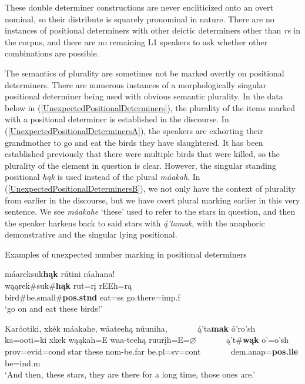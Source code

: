 These double determiner constructions are never encliticized onto an overt nominal, so their distribute is squarely pronominal in nature. There are no instances of positional determiners with other deictic determiners other than \textit{re} in the corpus, and there are no remaining L1 speakers to ask whether other combinations are possible.

The semantics of plurality are sometimes not be marked overtly on positional determiners. There are numerous instances of a morphologically singular positional determiner being used with obvious semantic plurality. In the data below in (\ref{UnexpectedPositionalDeterminers}), the plurality of the items marked with a positional determiner is established in the discourse. In (\ref{UnexpectedPositionalDeterminersA}), the speakers are exhorting their grandmother to go and eat the birds they have slaughtered. It has been established previously that there were multiple birds that were killed, so the plurality of the element in question is clear. However, the singular standing positional \textit{hąk} is used instead of the plural \textit{máakah}. In (\ref{UnexpectedPositionalDeterminersB}), we not only have the context of plurality from earlier in the discourse, but we have overt plural marking earlier in this very sentence. We see \textit{máakahe} `these' used to refer to the stars in question, and then the speaker harkens back to said stars with \textit{ą́'tamak}, with the anaphoric demonstrative and the singular lying positional.

\begin{exe}
    \item\label{UnexpectedPositionalDeterminers} Examples of unexpected number marking in positional determiners

    \begin{xlist}
        \item\label{UnexpectedPositionalDeterminersA} \glll máareksuk\textbf{hąk} rútini ráahana!\\
        wąąrek\#suk\#\textbf{hąk} rut=rį rEEh=rą\\
        \textnormal{bird}\#\textnormal{be.small}\#\textbf{pos.stnd} \textnormal{eat}=ss \textnormal{go.there}=imp.f\\
        \glt `go on and eat these birds!' \citep[148]{hollow1973a}

        \item\label{UnexpectedPositionalDeterminersB} \glll Karóotiki, xkék máakahe, wáateehą núuniha, ~ ~ ~ ~ ą́'ta\textbf{mak} ó'ro'sh\\
        ka=ooti=ki xkek wąąkah=E waa-teehą ruurįh=E=$\varnothing$ ~ ~ ~ ~ ą't\#\textbf{wąk} o'=o'sh\\
        prov=evid=cond \textnormal{star} \textnormal{these} nom-\textnormal{be.far} \textnormal{be}.pl=sv=cont ~ ~ ~ ~ dem.anap=\textbf{pos.lie} \textnormal{be}=ind.m\\
        \glt `And then, these stars, they are there for a long time, those ones are.' \citep[206]{hollow1973b}
    \end{xlist}
\end{exe}

